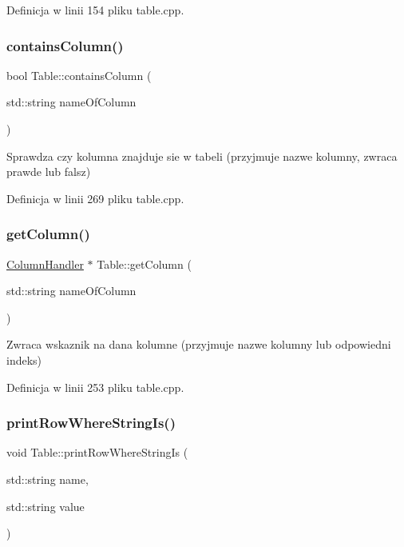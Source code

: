 Definicja w linii 154 pliku table.\+cpp.

\mbox{\label{class_table_aa6b2d58e79fbfc9e2bc7a3f912c5157c}} 
\subsubsection{\texorpdfstring{contains\+Column()}{containsColumn()}}
{\footnotesize\ttfamily bool Table\+::contains\+Column (\begin{DoxyParamCaption}\item[{std\+::string}]{name\+Of\+Column }\end{DoxyParamCaption})}

Sprawdza czy kolumna znajduje sie w tabeli (przyjmuje nazwe kolumny, zwraca prawde lub falsz) 

Definicja w linii 269 pliku table.\+cpp.

\mbox{\label{class_table_abf7854a77e6fa5f9421565a2acc34590}} 
\subsubsection{\texorpdfstring{get\+Column()}{getColumn()}}
{\footnotesize\ttfamily \mbox{\hyperlink{class_column_handler}{Column\+Handler}} $\ast$ Table\+::get\+Column (\begin{DoxyParamCaption}\item[{std\+::string}]{name\+Of\+Column }\end{DoxyParamCaption})}

Zwraca wskaznik na dana kolumne (przyjmuje nazwe kolumny lub odpowiedni indeks) 

Definicja w linii 253 pliku table.\+cpp.

\mbox{\label{class_table_a77b0e0d729f4dcee457a7e00b2bbd47f}} 
\subsubsection{\texorpdfstring{print\+Row\+Where\+String\+Is()}{printRowWhereStringIs()}}
{\footnotesize\ttfamily void Table\+::print\+Row\+Where\+String\+Is (\begin{DoxyParamCaption}\item[{std\+::string}]{name,  }\item[{std\+::string}]{value }\end{DoxyParamCaption})}

